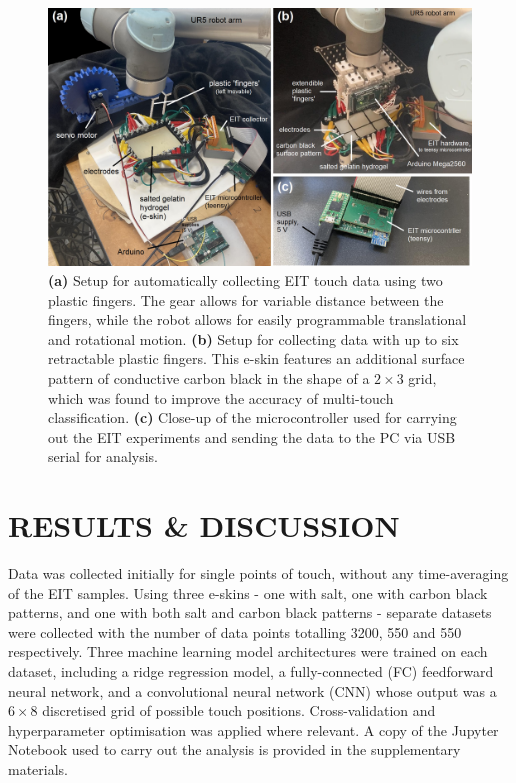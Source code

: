 \begin{figure}[htbp]
  \centering
  \includegraphics[width=0.9\columnwidth]{Images/Figure_2.jpg}
  \caption{\textbf{(a)} Setup for automatically collecting EIT touch data using two plastic fingers. The gear allows for variable distance between the fingers, while the robot allows for easily programmable translational and rotational motion. \textbf{(b)} Setup for collecting data with up to six retractable plastic fingers. This e-skin features an additional surface pattern of conductive carbon black in the shape of a $2 \times 3$ grid, which was found to improve the accuracy of multi-touch classification. \textbf{(c)} Close-up of the microcontroller used for carrying out the EIT experiments and sending the data to the PC via USB serial for analysis.}
  \label{fig:setup}
\end{figure}

\section{RESULTS \& DISCUSSION}

Data was collected initially for single points of touch, without any time-averaging of the EIT samples. Using three e-skins - one with salt, one with carbon black patterns, and one with both salt and carbon black patterns - separate datasets were collected with the number of data points totalling 3200, 550 and 550 respectively. Three machine learning model architectures were trained on each dataset, including a ridge regression model, a fully-connected (FC) feedforward neural network, and a convolutional neural network (CNN) whose output was a $ 6 \times 8 $ discretised grid of possible touch positions. Cross-validation and hyperparameter optimisation was applied where relevant. A copy of the Jupyter Notebook used to carry out the analysis is provided in the supplementary materials.

